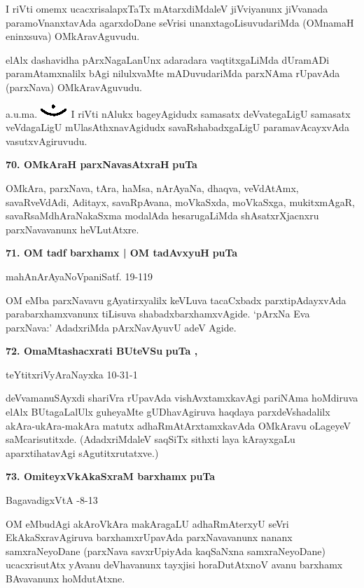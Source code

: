 I riVti omemx ucacxrisalapxTaTx mAtarxdiMdaleV jiVviyanunx jiVvanada paramoVnanxtavAda agarxdoDane seVrisi unanxtagoLisuvudariMda (OMnamaH eninxsuva) OMkAravAguvudu.

elAlx dashavidha pArxNagaLanUnx adaradara vaqtitxgaLiMda dUramADi paramAtamxnalilx bAgi nilulxvaMte mADuvudariMda parxNAma rUpavAda (parxNava) OMkAravAguvudu.

a.u.ma. {\includegraphics[scale=.6]{fig1.eps}} I riVti nAlukx bageyAgidudx samasatx deVvategaLigU samasatx veVdagaLigU mUlasAthxnavAgidudx savaRshabadxgaLigU paramavAcayxvAda vasutxvAgiruvudu.

\medskip
\noindent
\textbf{70. OMkAraH parxNavasAtxraH} \hfill{\bf puTa }

\smallskip
OMkAra, parxNava, tAra, haMsa, nArAyaNa, dhaqva, veVdAtAmx, savaRveVdAdi, Aditayx, savaRpAvana, moVkaSxda, moVkaSxga, mukitxmAgaR, savaRsaMdhAraNakaSxma modalAda hesarugaLiMda shAsatxrXjacnxru parxNavavanunx heVLutAtxre.


\medskip
\noindent
\textbf{71. OM tadf barxhamx | OM tadAvxyuH} \hfill{\bf puTa }

\hfill{mahAnArAyaNoVpaniSatf. 19-119}

\smallskip
OM eMba parxNavavu gAyatirxyalilx keVLuva tacaCxbadx parxtipAdayxvAda parabarxhamxvanunx tiLisuva shabadxbarxhamxvAgide. `pArxNa Eva parxNava:' AdadxriMda pArxNavAyuvU adeV Agide.

\medskip
\noindent
\textbf{72. OmaMtashacxrati BUteVSu} \hfill{\bf puTa , }

\hfill{teYtitxriVyAraNayxka 10-31-1}

\smallskip
deVvamanuSAyxdi shariVra rUpavAda vishAvxtamxkavAgi pariNAma hoMdiruva elAlx BUtagaLalUlx guheyaMte gUDhavAgiruva haqdaya parxdeVshadalilx akAra-ukAra-makAra matutx adhaRmAtArxtamxkavAda OMkAravu oLageyeV saMcarisutitxde. (AdadxriMdaleV saqSiTx sithxti laya kArayxgaLu aparxtihatavAgi sAgutitxrutatxve.)

\medskip
\noindent
\textbf{73. OmiteyxVkAkaSxraM barxhamx} \hfill{\bf puTa }

\hfill{BagavadigxVtA -8-13}

\smallskip
OM eMbudAgi akAroVkAra makAragaLU adhaRmAterxyU seVri EkAkaSxravAgiruva barxhamxrUpavAda parxNavavanunx nananx samxraNeyoDane (parxNava savxrUpiyAda kaqSaNxna samxraNeyoDane) ucacxrisutAtx yAvanu deVhavanunx tayxjisi horaDutAtxnoV avanu barxhamx BAvavanunx hoMdutAtxne.

